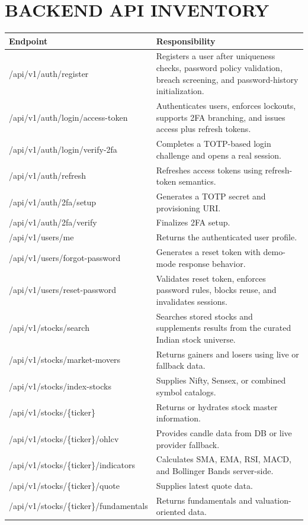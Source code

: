 \documentclass[12pt,a4paper]{report}
\begin{document}
\chapter{BACKEND API INVENTORY}
\begin{longtable}{p{} p{}}
\textbf{Endpoint} & \textbf{Responsibility} \\
\hline
/api/v1/auth/register & Registers a user after uniqueness checks, password policy validation, breach screening, and password-history initialization. \\
/api/v1/auth/login/access-token & Authenticates users, enforces lockouts, supports 2FA branching, and issues access plus refresh tokens. \\
/api/v1/auth/login/verify-2fa & Completes a TOTP-based login challenge and opens a real session. \\
/api/v1/auth/refresh & Refreshes access tokens using refresh-token semantics. \\
/api/v1/auth/2fa/setup & Generates a TOTP secret and provisioning URI. \\
/api/v1/auth/2fa/verify & Finalizes 2FA setup. \\
/api/v1/users/me & Returns the authenticated user profile. \\
/api/v1/users/forgot-password & Generates a reset token with demo-mode response behavior. \\
/api/v1/users/reset-password & Validates reset token, enforces password rules, blocks reuse, and invalidates sessions. \\
/api/v1/stocks/search & Searches stored stocks and supplements results from the curated Indian stock universe. \\
/api/v1/stocks/market-movers & Returns gainers and losers using live or fallback data. \\
/api/v1/stocks/index-stocks & Supplies Nifty, Sensex, or combined symbol catalogs. \\
/api/v1/stocks/\{ticker\} & Returns or hydrates stock master information. \\
/api/v1/stocks/\{ticker\}/ohlcv & Provides candle data from DB or live provider fallback. \\
/api/v1/stocks/\{ticker\}/indicators & Calculates SMA, EMA, RSI, MACD, and Bollinger Bands server-side. \\
/api/v1/stocks/\{ticker\}/quote & Supplies latest quote data. \\
/api/v1/stocks/\{ticker\}/fundamentals & Returns fundamentals and valuation-oriented data. \\

\end{longtable}
\end{document}

